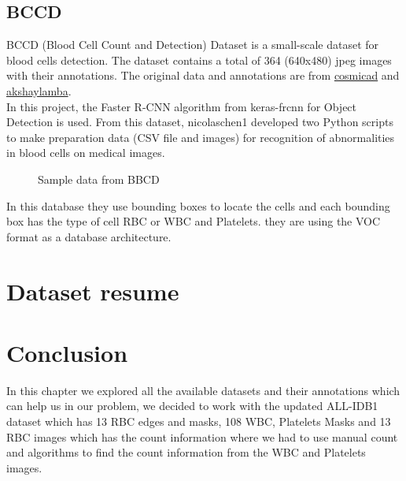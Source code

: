 \subsection{BCCD}
\hspace{\parindent}
BCCD (Blood Cell Count and Detection) Dataset is a small-scale dataset for blood cells detection. The dataset contains a total of 364 (640x480) jpeg images with their annotations. The original data and annotations are from \href{https://github.com/cosmicad/dataset}{cosmicad} and \href{https://github.com/akshaylamba/all_CELL_data}{akshaylamba}.\\
In this project, the Faster R-CNN algorithm from keras-frcnn for Object Detection is used. From this dataset, nicolaschen1 developed two Python scripts to make preparation data (CSV file and images) for recognition of abnormalities in blood cells on medical images.

\begin{figure}[H]
\centering
\caption{Sample data from BBCD}
\label{fig:BBCD1}
\end{figure}

In this database they use bounding boxes to locate the cells and each bounding box has the type of cell RBC or WBC and Platelets. they are using the VOC format as a database architecture.

\section{Dataset resume}
\hspace{\parindent}



\section{Conclusion}
\hspace{\parindent}
In this chapter we explored all the available datasets and their annotations which can help us in our problem, we decided to work with the updated ALL-IDB1 dataset which has 13 RBC edges and masks, 108 WBC, Platelets Masks and 13 RBC images which has the count information where we had to use manual count and algorithms to find the count information from the WBC and Platelets images.

\newpage
